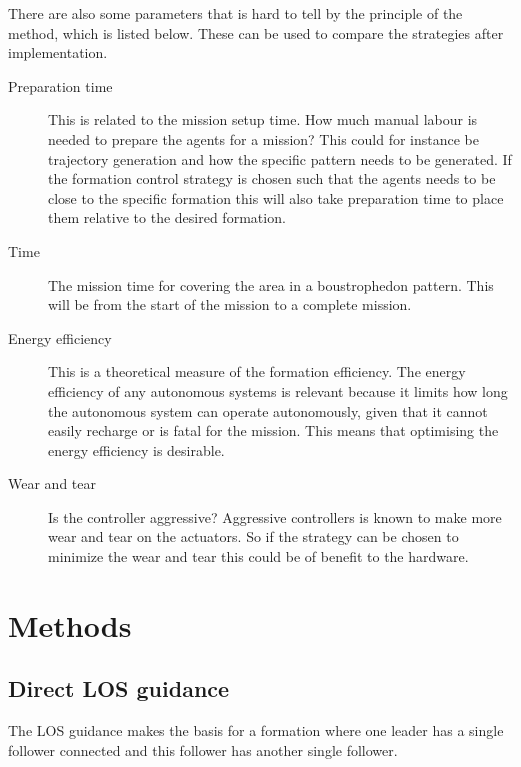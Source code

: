 There are also some parameters that is hard to tell by the principle
of the method, which is listed below. These can be used to compare the
strategies after implementation.
\begin{description}
\item[Preparation time] This is related to the mission setup time. How
	much manual labour is needed to prepare the agents for a mission?
	This could for instance be trajectory generation and how the
	specific pattern needs to be generated. If the formation control strategy is chosen such that the agents needs to be close to the specific formation this will also take preparation time to place them relative to the desired formation.
\item[Time] The mission time for covering the area in a boustrophedon
	pattern. This will be from the start of the mission to a complete mission.
\item[Energy efficiency] This is a theoretical measure of the
	formation efficiency. The energy efficiency of any autonomous systems is relevant because it limits how long the autonomous system can operate autonomously, given that it cannot easily recharge or is fatal for the mission. This means that optimising the energy efficiency is desirable.
\item[Wear and tear] Is the controller aggressive? Aggressive
	controllers is known to make more wear and tear on the actuators. So
	if the strategy can be chosen to minimize the wear and tear this
	could be of benefit to the hardware.
\end{description}


\section{Methods}

\subsection{Direct LOS guidance}
The \ac{LOS} guidance makes the basis for a formation where one leader has a single follower connected and this follower has another single follower. 
